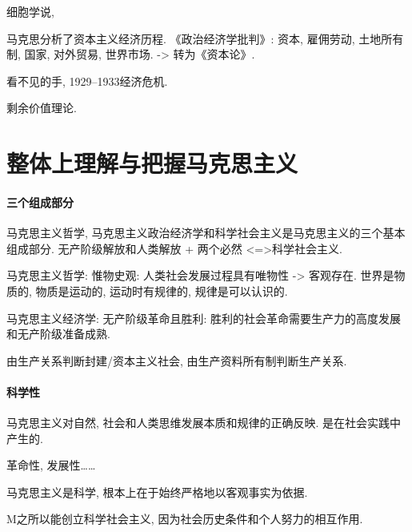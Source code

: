 \documentclass{ctexart}
\begin{document}
细胞学说, 
\par
马克思分析了资本主义经济历程.
《政治经济学批判》: 资本, 雇佣劳动, 土地所有制, 国家, 对外贸易, 世界市场. -> 转为《资本论》.

\begin{ex}[论据]
    看不见的手, 1929--1933经济危机.
\end{ex}

\begin{finale}
    剩余价值理论.
\end{finale}



\section{整体上理解与把握马克思主义} %
\label{sec:整体上理解与把握马克思主义}

\paragraph{三个组成部分} %
\label{par:三个组成部分}

马克思主义哲学, 马克思主义政治经济学和科学社会主义是马克思主义的三个基本组成部分. 无产阶级解放和人类解放 + 两个必然 <=>科学社会主义.


\par
马克思主义哲学: 惟物史观: 人类社会发展过程具有唯物性 -> 客观存在. 世界是物质的, 物质是运动的, 运动时有规律的, 规律是可以认识的.
\par
马克思主义经济学: 无产阶级革命且胜利: 胜利的社会革命需要生产力的高度发展和无产阶级准备成熟.

\begin{ex}
    由生产关系判断封建/资本主义社会, 由生产资料所有制判断生产关系.
\end{ex}

\paragraph{科学性} %
\label{par:科学性}

马克思主义对自然, 社会和人类思维发展本质和规律的正确反映. 是在社会实践中产生的.


革命性, 发展性……

\begin{ex}
    马克思主义是科学, 根本上在于{\color{red}始终严格地以客观事实为依据}.
\end{ex}
\begin{ex}
    M之所以能创立科学社会主义, 因为社会历史条件和个人努力的相互作用.
\end{ex}
\end{document}
